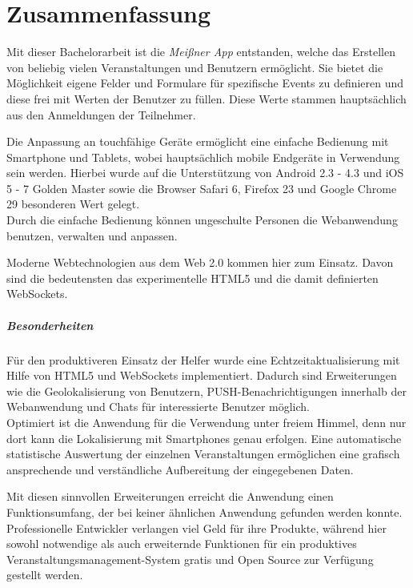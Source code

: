 \chapter{Zusammenfassung}
Mit dieser Bachelorarbeit ist die \emph{Meißner App} entstanden, welche das Erstellen von beliebig vielen Veranstaltungen und Benutzern ermöglicht. Sie bietet die Möglichkeit eigene Felder und Formulare für spezifische Events zu definieren und diese frei mit Werten der Benutzer zu füllen. Diese Werte stammen hauptsächlich aus den Anmeldungen der Teilnehmer.\par

Die Anpassung an touchfähige Geräte ermöglicht eine einfache Bedienung mit Smartphone und Tablets, wobei hauptsächlich mobile Endgeräte in Verwendung sein werden. Hierbei wurde auf die Unterstützung von Android 2.3 - 4.3 und iOS 5 - 7 Golden Master sowie die Browser Safari 6, Firefox 23 und Google Chrome 29 besonderen Wert gelegt.\\
Durch die einfache Bedienung können ungeschulte Personen die Webanwendung benutzen, verwalten und anpassen.\par

Moderne Webtechnologien aus dem Web 2.0 kommen hier zum Einsatz. Davon sind die bedeutensten das experimentelle HTML5 und die damit definierten WebSockets.

\paragraph{Besonderheiten} 
Für den produktiveren Einsatz der Helfer wurde eine Echtzeitaktualisierung mit Hilfe von HTML5 und WebSockets implementiert. Dadurch sind Erweiterungen wie die Geolokalisierung von Benutzern, PUSH-Benachrichtigungen innerhalb der Webanwendung und Chats für interessierte Benutzer möglich.\\
Optimiert ist die Anwendung für die Verwendung unter freiem Himmel, denn nur dort kann die Lokalisierung mit Smartphones genau erfolgen. Eine automatische statistische Auswertung der einzelnen Veranstaltungen ermöglichen eine grafisch ansprechende und verständliche Aufbereitung der eingegebenen Daten.\par

Mit diesen sinnvollen Erweiterungen erreicht die Anwendung einen Funktionsumfang, der bei keiner ähnlichen Anwendung gefunden werden konnte. Professionelle Entwickler verlangen viel Geld für ihre Produkte, während hier sowohl notwendige als auch erweiternde Funktionen für ein produktives Veranstaltungsmanagement-System gratis und Open Source zur Verfügung gestellt werden.\par

